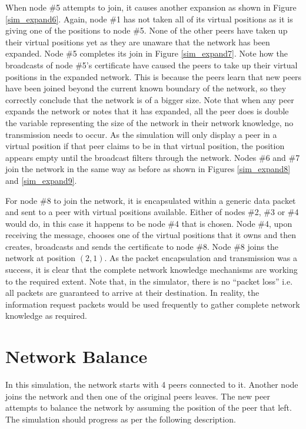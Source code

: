 \documentclass[ %
                    author={Luke Murray},
                supervisor={Dr. Simon Hollis},
                     title={Shadow Peer-to-Peer Networks},
                  subtitle={},
                    degree={MEng},
                      year={2013} ]{thesis}
\begin{document}
When node \#5 attempts to join, it causes another expansion as shown in Figure \ref{sim_expand6}. Again, node \#1 has not taken all of its virtual positions as it is giving one of the positions to node \#5. None of the other peers have taken up their virtual positions yet as they are unaware that the network has been expanded. Node \#5 completes its join in Figure \ref{sim_expand7}. Note how the broadcasts of node \#5's certificate have caused the peers to take up their virtual positions in the expanded network. This is because the peers learn that new peers have been joined beyond the current known boundary of the network, so they correctly conclude that the network is of a bigger size. Note that when any peer expands the network or notes that it has expanded, all the peer does is double the variable representing the size of the network in their network knowledge, no transmission needs to occur. As the simulation will only display a peer in a virtual position if that peer claims to be in that virtual position, the position appears empty until the broadcast filters through the network. Nodes \#6 and \#7 join the network in the same way as before as shown in Figures \ref{sim_expand8} and \ref{sim_expand9}.

For node \#8 to join the network, it is encapsulated within a generic data packet and sent to a peer with virtual positions available. Either of nodes \#2, \#3 or \#4 would do, in this case it happens to be node \#4 that is chosen. Node \#4, upon receiving the message, chooses one of the virtual positions that it owns and then creates, broadcasts and sends the certificate to node \#8. Node \#8 joins the network at position $(2, 1)$. As the packet encapsulation and transmission was a success, it is clear that the complete network knowledge mechanisms are working to the required extent. Note that, in the simulator, there is no ``packet loss'' i.e. all packets are guaranteed to arrive at their destination. In reality, the information request packets would be used frequently to gather complete network knowledge as required.

\section{Network Balance}

In this simulation, the network starts with 4 peers connected to it. Another node joins the network and then one of the original peers leaves. The new peer attempts to balance the network by assuming the position of the peer that left. The simulation should progress as per the following description.
\end{document}
